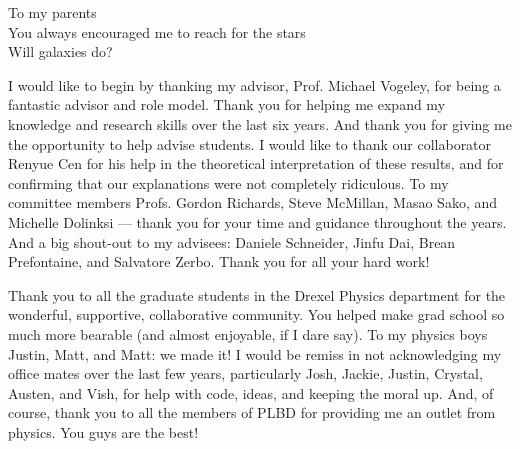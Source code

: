 \begin{preamble}

\iffinal{}{\newpage}


\begin{DUTdedications}
\begin{center}
To my parents\\
You always encouraged me to reach for the stars\\
Will galaxies do?
\end{center}
\end{DUTdedications}

\iffinal{}{\newpage}


\begin{acknowledgments}

I would like to begin by thanking my advisor, Prof. Michael Vogeley, for being a 
fantastic advisor and role model.  Thank you for helping me expand my knowledge 
and research skills over the last six years.  And thank you for giving me the 
opportunity to help advise students.  I would like to thank our collaborator 
Renyue Cen for his help in the theoretical interpretation of these results, and 
for confirming that our explanations were not completely ridiculous.  To my 
committee members Profs. Gordon Richards, Steve McMillan, Masao Sako, and 
Michelle Dolinksi --- thank you for your time and guidance throughout the years.  
And a big shout-out to my advisees: Daniele Schneider, Jinfu Dai, Brean 
Prefontaine, and Salvatore Zerbo.  Thank you for all your hard work!

Thank you to all the graduate students in the Drexel Physics department for the 
wonderful, supportive, collaborative community.  You helped make grad school so 
much more bearable (and almost enjoyable, if I dare say).  To my physics boys 
Justin, Matt, and Matt: we made it!  I would be remiss in not acknowledging my 
office mates over the last few years, particularly Josh, Jackie, Justin, 
Crystal, Austen, and Vish, for help with code, ideas, and keeping the moral up.  
And, of course, thank you to all the members of PLBD for providing me an outlet 
from physics.  You guys are the best!


\end{acknowledgments}
\end{preamble}
